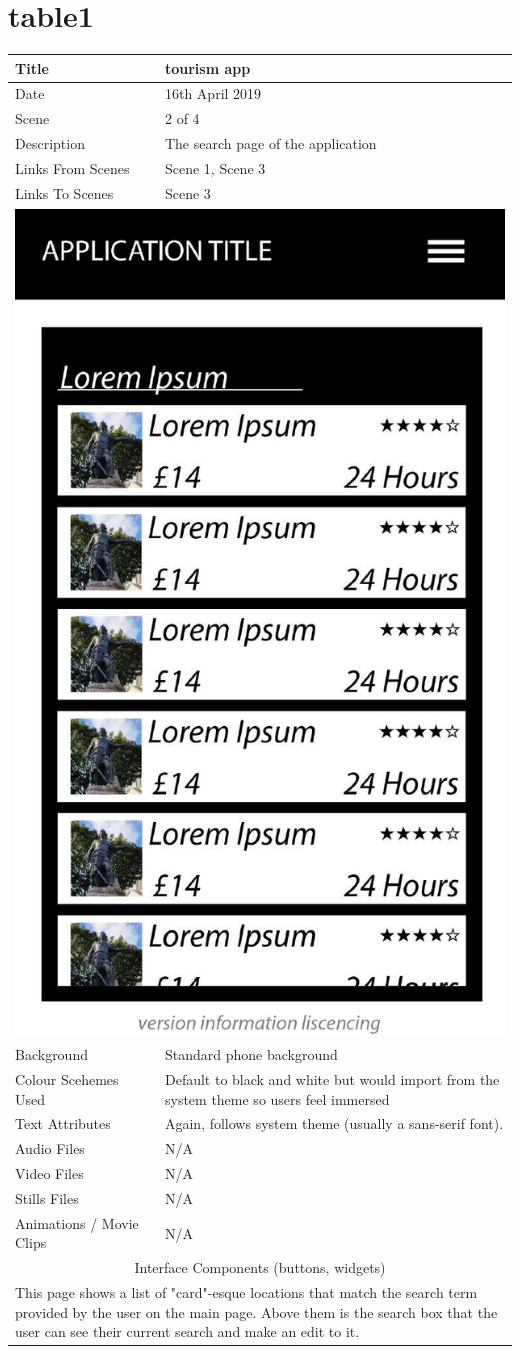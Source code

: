 \section{table1}
\hspace{-1cm}
	\centering
	\begin{tabular}{p{4cm}p{10cm}}
		\hline
		Title & tourism app \\
		\hline
		Date & 16th April 2019 \\
		\hline
		Scene & 2 of 4 \\
		\hline
		Description & The search page of the application \\
		\hline
		Links From Scenes & Scene 1, Scene 3 \\
		\hline
		Links To Scenes & Scene 3 \\
		\hline
		\multicolumn{2}{c}{\includegraphics[width=0.5\linewidth]{images/screen1.jpg}} \\
		\hline
		Background & Standard phone background \\
		\hline
		Colour Scehemes Used & Default to black and white but would import from the system theme so users feel immersed \\
		\hline
		Text Attributes & Again, follows system theme (usually a sans-serif font). \\
		\hline
		Audio Files & N/A \\
		\hline
		Video Files & N/A \\
		\hline
		Stills Files & N/A \\
		\hline
		Animations / Movie Clips & N/A \\
		\hline
		\multicolumn{2}{c}{Interface Components (buttons, widgets)} \\
		\hline
		\multicolumn{2}{p{14cm}}{ This page shows a list of "card"-esque locations that match the search term provided by the user on the main page. Above them is the search box that the user can see their current search and make an edit to it.  } \\
		\hline
	\end{tabular}
